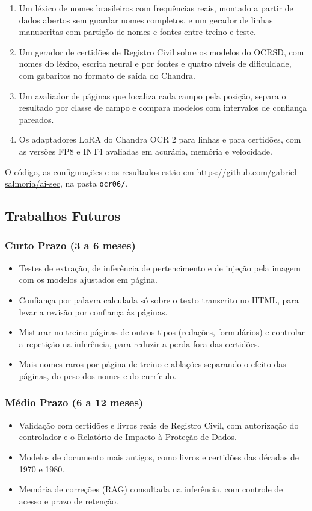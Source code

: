 \documentclass[12pt,a4paper]{article}
\begin{document}
\begin{enumerate}
    \item Um léxico de nomes brasileiros com frequências reais, montado a partir de dados abertos sem guardar nomes completos, e um gerador de linhas manuscritas com partição de nomes e fontes entre treino e teste.
    \item Um gerador de certidões de Registro Civil sobre os modelos do OCRSD, com nomes do léxico, escrita neural e por fontes e quatro níveis de dificuldade, com gabaritos no formato de saída do Chandra.
    \item Um avaliador de páginas que localiza cada campo pela posição, separa o resultado por classe de campo e compara modelos com intervalos de confiança pareados.
    \item Os adaptadores LoRA do Chandra OCR 2 para linhas e para certidões, com as versões FP8 e INT4 avaliadas em acurácia, memória e velocidade.
\end{enumerate}

O código, as configurações e os resultados estão em \url{https://github.com/gabriel-salmoria/ai-sec}, na pasta \texttt{ocr06/}.

\subsection{Trabalhos Futuros}

\subsubsection{Curto Prazo (3 a 6 meses)}
\begin{itemize}
    \item Testes de extração, de inferência de pertencimento e de injeção pela imagem com os modelos ajustados em página.
    \item Confiança por palavra calculada só sobre o texto transcrito no HTML, para levar a revisão por confiança às páginas.
    \item Misturar no treino páginas de outros tipos (redações, formulários) e controlar a repetição na inferência, para reduzir a perda fora das certidões.
    \item Mais nomes raros por página de treino e ablações separando o efeito das páginas, do peso dos nomes e do currículo.
\end{itemize}

\subsubsection{Médio Prazo (6 a 12 meses)}
\begin{itemize}
    \item Validação com certidões e livros reais de Registro Civil, com autorização do controlador e o Relatório de Impacto à Proteção de Dados.
    \item Modelos de documento mais antigos, como livros e certidões das décadas de 1970 e 1980.
    \item Memória de correções (RAG) consultada na inferência, com controle de acesso e prazo de retenção.
\end{itemize}
\end{document}
